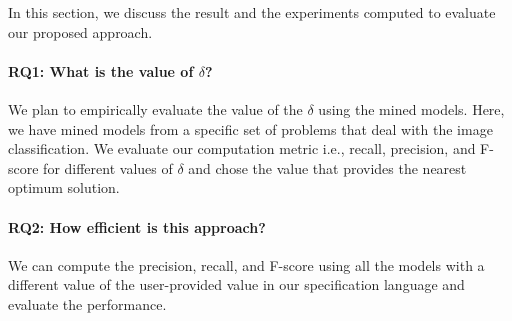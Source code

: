 In this section, we discuss the result and the experiments computed to evaluate our proposed approach.
\paragraph{\textbf{RQ1: What is the value of $\delta$?}}
We plan to empirically evaluate the value of the $\delta$ using the mined models. Here, we have mined models from a specific set of problems that deal with the image classification. We evaluate our computation metric i.e., recall, precision, and F-score for different values of $\delta$ and chose the value that provides the nearest optimum solution.
\paragraph{\textbf{RQ2: How efficient is this approach?}}
We can compute the precision, recall, and F-score using all the models with a different value of the user-provided value in our specification language and evaluate the performance.

